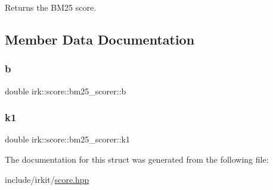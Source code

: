 Returns the B\+M25 score. 



\subsection{Member Data Documentation}
\mbox{\label{structirk_1_1score_1_1bm25__scorer_adbc316be2c46daf96501ec1f79c96e73}} 
\subsubsection{\texorpdfstring{b}{b}}
{\footnotesize\ttfamily double irk\+::score\+::bm25\+\_\+scorer\+::b}

\mbox{\label{structirk_1_1score_1_1bm25__scorer_ad39731decbddbe8d09c3094e75938f4e}} 
\subsubsection{\texorpdfstring{k1}{k1}}
{\footnotesize\ttfamily double irk\+::score\+::bm25\+\_\+scorer\+::k1}



The documentation for this struct was generated from the following file\+:\begin{DoxyCompactItemize}
\item 
include/irkit/\mbox{\hyperlink{score_8hpp}{score.\+hpp}}\end{DoxyCompactItemize}
